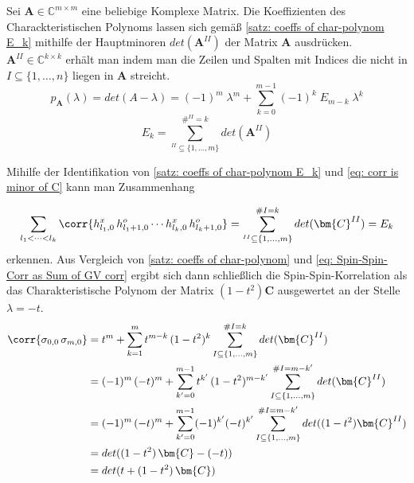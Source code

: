 \begin{grayframe}[frametitle = {Satz über die Koeffizienten des Charackteristischen Polynoms}]

Sei $\bm{A}\in \mathbb{C}^{m\times m}$ eine beliebige Komplexe Matrix. Die Koeffizienten des Charackteristischen Polynoms lassen sich gemäß \eqref{satz: coeffs of char-polynom E_k} mithilfe der Hauptminoren $det(\bm{A}^{II})$ der Matrix $\bm{A}$ ausdrücken. $\bm{A}^{II} \in  \mathbb{C}^{k\times k}$ erhält man indem man die Zeilen und Spalten mit Indices die nicht in $I\subseteq \{1,\dots,n\}$ liegen in $\bm{A}$ streicht. 
\begin{equation} \label{satz: coeffs of char-polynom}
p_{\bm{A}}(\lambda) = det(A - \lambda) = (-1)^m \;\lambda^m + \sum_{k = 0}^{m-1} (-1)^k \;E_{m-k} \;\lambda^k
\end{equation}
\begin{equation} \label{satz: coeffs of char-polynom E_k}
E_k = \sum_{^{II} \subseteq \{1,\dots,m\} }^{\#^{II} = k} det(\bm{A}^{II})
\end{equation}
\end{grayframe}

\noindent Mihilfe der Identifikation von \eqref{satz: coeffs of char-polynom E_k} und \eqref{eq: corr is minor of C} kann man Zusammenhang 

\begin{equation}
\sum_{l_1 < \dots < l_k}  \corr{h_{l_1,0}^x\, h_{l_1+1,0}^o \cdots h_{l_k,0}^x\, h_{l_k+1,0}^o} = \sum_{^{II} \subseteq \{1,\dots,m\} }^{\#I = k} det(\bm{C}^{II}) = E_{k}
\end{equation}
erkennen. Aus Vergleich von \eqref{satz: coeffs of char-polynom} und \eqref{eq: Spin-Spin-Corr as Sum of GV corr} ergibt sich dann schließlich die Spin-Spin-Korrelation als das Charakteristische Polynom der Matrix $(1-t^2)\bm{C}$ ausgewertet an der Stelle $\lambda = -t$.
\begin{align}
 \corr{\sigma_{0,0}\, \sigma_{m,0}} 
 &= t^m  + \sum_{k = 1}^{m} t^{m-k} \, (1-t^2)^{k} \sum_{I \subseteq \{1,\dots,m\} }^{\#I = k} det(\bm{C}^{II}) \nonumber \\
 &= (-1)^m\,(-t)^m  + \sum_{k' = 0}^{m-1} t^{k'} \, (1-t^2)^{m-k'} \sum_{I \subseteq \{1,\dots,m\} }^{\#I = m-k'} det(\bm{C}^{II}) \nonumber\\
 &= (-1)^m\,(-t)^m  + \sum_{k' = 0}^{m-1} (-1)^{k'} (-t)^{k'} \sum_{I \subseteq \{1,\dots,m\} }^{\#I = m-k'}  det((1-t^2)\bm{C}^{II}) \nonumber \\
 &= det((1-t^2)\,\bm{C} - (-t)) \nonumber \\
 &= det(t + (1-t^2)\,\bm{C}) \nonumber
\end{align}

